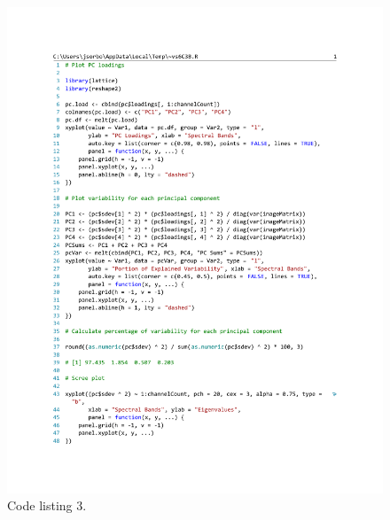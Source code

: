 \documentclass[conference,compsoc]{IEEEtran}
\begin{document}
\begin{figure}[!t]
\centering
\includegraphics[width=7in]{code-listing-3.pdf}
\caption{Code listing 3.}
\label{code-listing-3}
\end{figure}
\end{document}

